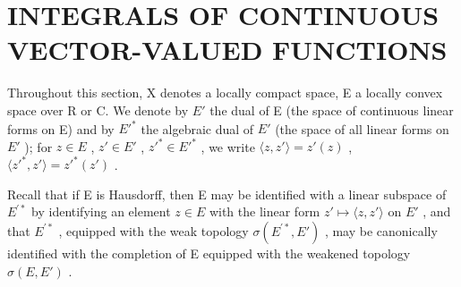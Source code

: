 \section{INTEGRALS OF CONTINUOUS VECTOR-VALUED FUNCTIONS}

Throughout this section, X denotes a locally compact space, E a locally convex space over R or C. We denote by \(E'\) the dual of E (the space of continuous linear forms on E) and by \(E'^{*}\) the algebraic dual of \(E'\) (the space of all linear forms on \(E'\) ); for \(z \in E\) , \(z' \in E'\) , \(z'^{*} \in E'^{*}\) , we write \(\langle z, z' \rangle = z'(z)\) , \(\langle z'^{*}, z' \rangle = z'^{*}(z')\) .

Recall that if E is Hausdorff, then E may be identified with a linear subspace of \(E^{\prime*}\) by identifying an element \(z \in E\) with the linear form \(z' \mapsto \langle z, z' \rangle\) on \(E'\) , and that \(E^{\prime*}\) , equipped with the weak topology \(\sigma(E^{\prime*}, E')\) , may be canonically identified with the completion of E equipped with the weakened topology \(\sigma(E, E')\) .

